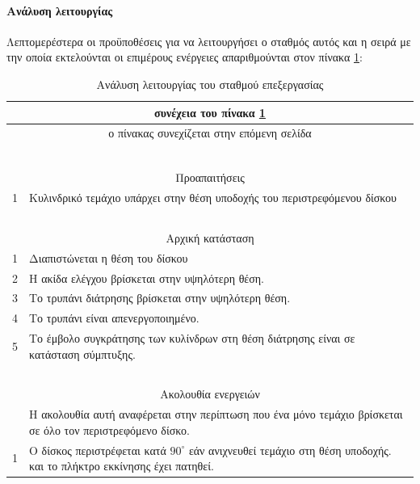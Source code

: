 \documentclass[a4paper,12pt,twoside]{report}
\begin{document}
{				\paragraph{Ανάλυση λειτουργίας} {Λεπτομερέστερα οι προϋποθέσεις για να λειτουργήσει ο σταθμός αυτός και η σειρά με την οποία εκτελούνται οι επιμέρους ενέργειες απαριθμούνται στον πίνακα \ref{πιν.:Ανάλυση λειτουργίας του σταθμού επεξεργασίας}:
				}
				\begin{longtable} { m{0.5cm} m{12cm} }
					\caption [Ανάλυση λειτουργίας του σταθμού επεξεργασίας]  {Ανάλυση λειτουργίας του σταθμού επεξεργασίας \cite{FestoMPSProcessingStationManual}}
					\label{πιν.:Ανάλυση λειτουργίας του σταθμού επεξεργασίας}\\
					\hline
					\endfirsthead
					\multicolumn{2}{c}{συνέχεια του πίνακα \ref{πιν.:Ανάλυση λειτουργίας του σταθμού επεξεργασίας}}\\
					\hline
					\endhead
					\hline
					\multicolumn{2}{c}{ο πίνακας συνεχίζεται στην επόμενη σελίδα}\\
					\endfoot
					\multicolumn{2}{c}{ολοκληρώθηκε ο πίνακας \ref{πιν.:Ανάλυση λειτουργίας του σταθμού επεξεργασίας}}\\
					\endlastfoot
					~\\
					\multicolumn{2}{c}{Προαπαιτήσεις}\\
					1 & Κυλινδρικό τεμάχιο υπάρχει στην θέση υποδοχής του περιστρεφόμενου δίσκου\\
					\hline
					~\\
					\multicolumn{2}{c}{Αρχική κατάσταση}\\
					1 & Διαπιστώνεται η θέση του δίσκου\\
					2 & Η ακίδα ελέγχου βρίσκεται στην υψηλότερη θέση.\\
					3 & Το τρυπάνι διάτρησης βρίσκεται στην υψηλότερη θέση.\\
					4 & Το τρυπάνι είναι απενεργοποιημένο.\\
					5 & Το έμβολο συγκράτησης των κυλίνδρων στη θέση διάτρησης είναι σε κατάσταση σύμπτυξης.\\
					\hline
					~\\
					\multicolumn{2}{c}{Ακολουθία ενεργειών}\\
					  & Η ακολουθία αυτή αναφέρεται στην περίπτωση που ένα μόνο τεμάχιο βρίσκεται σε όλο τον περιστρεφόμενο δίσκο.\\
					1 & Ο δίσκος περιστρέφεται κατά $90^{\circ}$ εάν ανιχνευθεί τεμάχιο στη θέση υποδοχής. και το πλήκτρο εκκίνησης έχει πατηθεί.\\

\end{longtable}}
\end{document}
